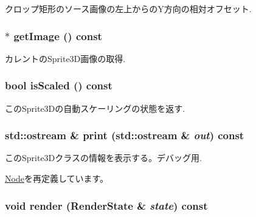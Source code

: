 クロップ矩形のソース画像の左上からのY方向の相対オフセット. \hypertarget{classm3g_1_1Sprite3D_a8c0193b0e7d47d4b5c9f60df24c44f5}{
\subsubsection[{getImage}]{ $\ast$ getImage () const}}
\label{classm3g_1_1Sprite3D_a8c0193b0e7d47d4b5c9f60df24c44f5}


カレントのSprite3D画像の取得. \hypertarget{classm3g_1_1Sprite3D_8e3e7fa70e1d3f2342580991105779f5}{
\subsubsection[{isScaled}]{\setlength{\rightskip}{0pt plus 5cm}bool isScaled () const}}
\label{classm3g_1_1Sprite3D_8e3e7fa70e1d3f2342580991105779f5}


このSprite3Dの自動スケーリングの状態を返す. \hypertarget{classm3g_1_1Sprite3D_6fea17fa1532df3794f8cb39cb4f911f}{
\subsubsection[{print}]{\setlength{\rightskip}{0pt plus 5cm}std::ostream \& print (std::ostream \& {\em out}) const}}
\label{classm3g_1_1Sprite3D_6fea17fa1532df3794f8cb39cb4f911f}


このSprite3Dクラスの情報を表示する。デバッグ用. 

\hyperlink{classm3g_1_1Node_6fea17fa1532df3794f8cb39cb4f911f}{Node}を再定義しています。\hypertarget{classm3g_1_1Sprite3D_8babc8a79b78615da51161e94029eea9}{
\subsubsection[{render}]{\setlength{\rightskip}{0pt plus 5cm}void render ({\bf RenderState} \& {\em state}) const}}
\label{classm3g_1_1Sprite3D_8babc8a79b78615da51161e94029eea9}



